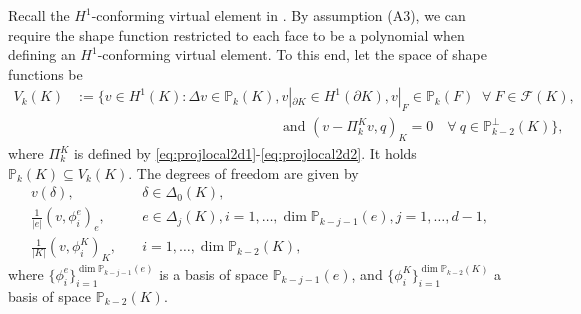 \documentclass[10pt]{amsart}
\numberwithin{equation}{section}
\begin{document}
Recall the $H^1$-conforming virtual element in \cite{ChenHuangWei2022,AhmadAlsaediBrezziMariniEtAl2013,BeiraoBrezziCangianiManziniEtAl2013,BeiraoBrezziMariniRusso2014}.
By assumption (A3), we can require the shape function restricted to each face to be a polynomial when defining an $H^1$-conforming virtual element.
To this end, let the space of shape functions be
\begin{align*}
V_k(K)&:=\big\{ v\in H^1(K): \Delta v\in \mathbb P_{k}(K),  v|_{\partial K}\in H^1(\partial K),  v|_F\in \mathbb P_{k}(F)\;\;\forall~F\in\mathcal F(K),\\    
&\qquad\qquad\qquad\qquad\qquad\qquad\qquad\;\;\; \textrm{and } (v-\Pi_k^Kv, q)_K=0\quad\forall~q\in\mathbb P_{k-2}^{\perp}(K)\},
\end{align*}
where $\Pi_k^K$ is defined by \eqref{eq:projlocal2d1}-\eqref{eq:projlocal2d2}.
It holds $\mathbb P_k(K)\subseteq V_k(K)$.
The degrees of freedom are given by
\begin{align}
v(\delta), & \quad \delta\in\Delta_0(K), \label{eq:cfmvemdof1}\\
\frac{1}{|e|}(v, \phi_i^e)_e, & \quad e\in\Delta_j(K), i=1,\ldots, \dim\mathbb P_{k-j-1}(e), j=1,\ldots, d-1, \label{eq:cfmvemdof2}\\
\frac{1}{|K|}(v, \phi_i^K)_K, & \quad i=1,\ldots, \dim\mathbb P_{k-2}(K), \label{eq:cfmvemdof3}
\end{align}
where $\{\phi_i^e\}_{i=1}^{\dim\mathbb P_{k-j-1}(e)}$ is a basis of space $\mathbb P_{k-j-1}(e)$, and $\{\phi_i^K\}_{i=1}^{\dim\mathbb P_{k-2}(K)}$ a basis of space $\mathbb P_{k-2}(K)$.
\end{document}
